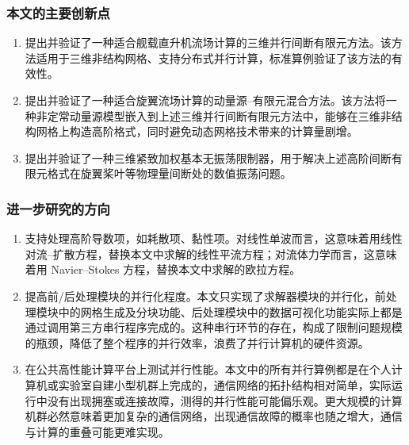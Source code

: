 \subsubsection*{本文的主要创新点}
\begin{enumerate}[wide]
\item 提出并验证了一种适合舰载直升机流场计算的三维并行间断有限元方法。该方法适用于三维非结构网格、支持分布式并行计算，标准算例验证了该方法的有效性。
\item 提出并验证了一种适合旋翼流场计算的动量源–有限元混合方法。该方法将一种非定常动量源模型嵌入到上述三维并行间断有限元方法中，能够在三维非结构网格上构造高阶格式，同时避免动态网格技术带来的计算量剧增。
\item 提出并验证了一种三维紧致加权基本无振荡限制器，用于解决上述高阶间断有限元格式在旋翼桨叶等物理量间断处的数值振荡问题。
\end{enumerate}


\subsubsection*{进一步研究的方向}
\begin{enumerate}[wide]
\item 支持处理高阶导数项，如耗散项、黏性项。对线性单波而言，这意味着用线性对流–扩散方程，替换本文中求解的线性平流方程；对流体力学而言，这意味着用
Navier–Stokes 方程，替换本文中求解的欧拉方程。 
\item 提高前/后处理模块的并行化程度。本文只实现了求解器模块的并行化，前处理模块中的网格生成及分块功能、后处理模块中的数据可视化功能实际上都是通过调用第三方串行程序完成的。这种串行环节的存在，构成了限制问题规模的瓶颈，降低了整个程序的并行效率，浪费了并行计算机的硬件资源。
\item 在公共高性能计算平台上测试并行性能。本文中的所有并行算例都是在个人计算机或实验室自建小型机群上完成的，通信网络的拓扑结构相对简单，实际运行中没有出现拥塞或连接故障，测得的并行性能可能偏乐观。更大规模的计算机群必然意味着更加复杂的通信网络，出现通信故障的概率也随之增大，通信与计算的重叠可能更难实现。
\end{enumerate}
